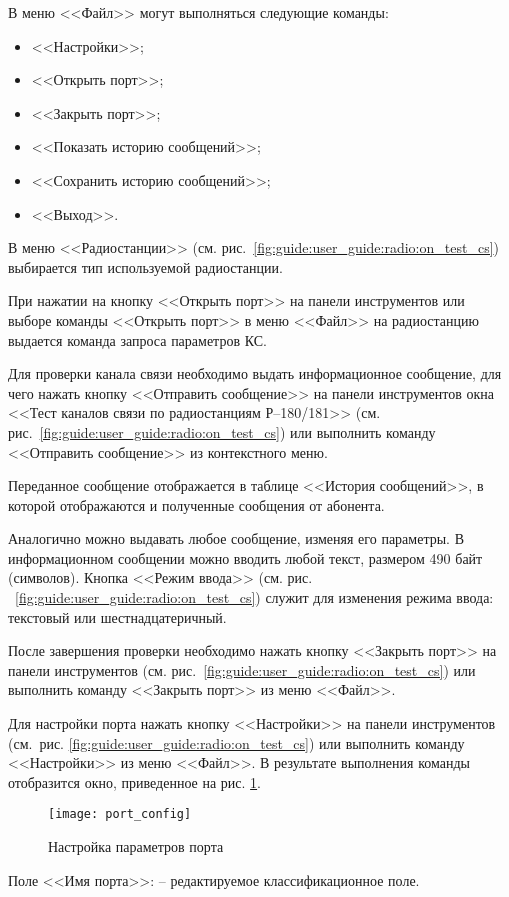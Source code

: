 В меню <<Файл>> могут выполняться следующие команды:
\begin{itemize}
	\item <<Настройки>>;
	\item <<Открыть порт>>;
	\item <<Закрыть порт>>;
	\item <<Показать историю сообщений>>;
	\item <<Сохранить историю сообщений>>;
	\item <<Выход>>.
\end{itemize}

В меню <<Радиостанции>> (см. рис.~\ref{fig:guide:user_guide:radio:on_test_cs}) выбирается тип используемой радиостанции.

При нажатии на кнопку <<Открыть порт>> на панели инструментов или выборе команды <<Открыть порт>> в меню <<Файл>> на радиостанцию выдается команда запроса параметров КС.

Для проверки канала связи необходимо выдать информационное сообщение, для чего нажать кнопку <<Отправить сообщение>> на
панели инструментов окна <<Тест каналов связи по радиостанциям Р–180/181>> (см.
рис.~\ref{fig:guide:user_guide:radio:on_test_cs}) или выполнить команду <<Отправить сообщение>> из контекстного меню.

Переданное сообщение отображается в таблице <<История сообщений>>, в которой отображаются и полученные сообщения от абонента.

Аналогично можно выдавать любое сообщение, изменяя его параметры. В информационном сообщении можно вводить любой текст,
размером 490 байт (символов). Кнопка <<Режим ввода>> (см. рис. ~\ref{fig:guide:user_guide:radio:on_test_cs}) служит для изменения режима ввода: текстовый или шестнадцатеричный.

После завершения проверки необходимо нажать кнопку <<Закрыть порт>> на панели инструментов (см.
рис.~\ref{fig:guide:user_guide:radio:on_test_cs}) или выполнить команду <<Закрыть порт>> из меню <<Файл>>.

Для настройки порта нажать кнопку <<Настройки>> на панели инструментов (см. рис. \ref{fig:guide:user_guide:radio:on_test_cs}) или выполнить команду
<<Настройки>> из меню <<Файл>>.
В результате выполнения команды отобразится окно, приведенное на рис. \ref{fig:guide:user_guide:radio:port_config}.
\begin{figure}[htb]
	\centering
	\texttt{[image: port\_config]}
	\caption{Настройка параметров порта}
	\label{fig:guide:user_guide:radio:port_config}
\end{figure}
Поле <<Имя порта>>: -- редактируемое классификационное поле.

